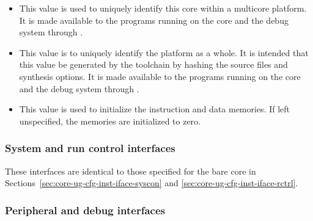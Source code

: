 \begin{itemize}
\item {}

This value is used to uniquely identify this core within a multicore platform. 
It is made available to the programs running on the core and the debug system 
through .

\item {}

This value is to uniquely identify the platform as a whole. It is intended that
this value be generated by the toolchain by hashing the source files and
synthesis options.  It is made available to the
programs running on the core and the debug system through .

\item {}

This value is used to initialize the instruction and data memories. If left
unspecified, the memories are initialized to zero.

\end{itemize}

\subsubsection{System and run control interfaces}
\label{sec:rvsyssa-iface-sysrctrl}

These interfaces are identical to those specified for the bare \rvex{} core in 
Sections~\ref{sec:core-ug-cfg-inst-iface-syscon} and 
\ref{sec:core-ug-cfg-inst-iface-rctrl}.

\subsubsection{Peripheral and debug interfaces}
\label{sec:rvsyssa-iface-periph}

